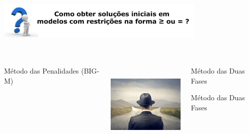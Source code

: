 \documentclass{beamer}
\begin{document}
\begin{frame}
	\centering
	\includegraphics[width=10cm,height=3cm]{Pergunta_Final.png}
	\begin{columns}
		\begin{column}{0.33\textwidth}
			\begin{mdframed}[backgroundcolor=green!80]
				\centering
				Método das Penalidades (BIG-M)
			\end{mdframed}	
		\end{column}
		\begin{column}{0.33\textwidth}
			\centering
			\includegraphics[width=4cm,height=4cm]{twoways.jpg}
		\end{column}
		\hspace{0.2cm}
		\begin{column}{0.33\textwidth}
			\only<1>
			{
				\begin{mdframed}[backgroundcolor=green!80]
					\centering
					Método das Duas Fases
				\end{mdframed}		
			}
			\only<2>
			{
				\begin{mdframed}[backgroundcolor=red!80]
					\centering
					Método das Duas Fases
				\end{mdframed}		
			}
		\end{column}
	\end{columns}
\end{frame}
\end{document}

